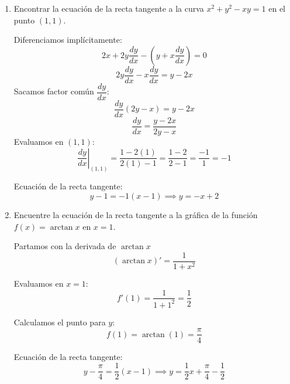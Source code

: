 \documentclass[letterpaper,12pt]{article}
\theoremstyle{plain}
\theoremstyle{definition}
\newcommand{\1}{\mathbbm{1}}
\begin{document}
\begin{enumerate}[label=\textbf{P\arabic*.}, itemsep=0cm]
\begin{enumerate}
\color{black}
    
\end{enumerate}
\item Encontrar la ecuaci\'on de la recta tangente a la curva $x^2 + y^2 - xy = 1$ en el punto $(1,1)$.

 \color{blue}
Diferenciamos implícitamente:
\[
2x + 2y \frac{dy}{dx} - \left( y + x \frac{dy}{dx} \right) = 0
\]
\[
2y \frac{dy}{dx} - x \frac{dy}{dx} = y - 2x
\]
Sacamos factor común \(\dfrac{dy}{dx}\):
\[
\frac{dy}{dx}(2y - x) = y - 2x
\]
\[
\frac{dy}{dx} = \frac{y - 2x}{2y - x}
\]
Evaluamos en \((1,1)\):
\[
\left.\frac{dy}{dx}\right|_{(1,1)} = \frac{1 - 2(1)}{2(1) - 1} = \frac{1 - 2}{2 - 1} = \frac{-1}{1} = -1
\]

Ecuación de la recta tangente:
\[
y - 1 = -1 (x - 1) \implies y = -x + 2
\]
\color{black}
\item Encuentre la ecuaci\'on de la recta tangente a la gr\'afica de la funci\'on $f(x) = \arctan x$ en $x = 1$.

 \color{blue}
Partamos con la derivada de $\arctan x$
\[
(\arctan x)' = \frac{1}{1 + x^2}
\]

Evaluamos en \( x = 1 \):
\[
f'(1) = \frac{1}{1 + 1^2} = \frac{1}{2}
\]

Calculamos el punto para $y$:
\[
f(1) = \arctan(1) = \frac{\pi}{4}
\]

Ecuación de la recta tangente:
\[
y - \frac{\pi}{4} = \frac{1}{2}(x - 1) \implies y = \frac{1}{2}x + \frac{\pi}{4} - \frac{1}{2}
\]

\end{enumerate}
\end{document}
